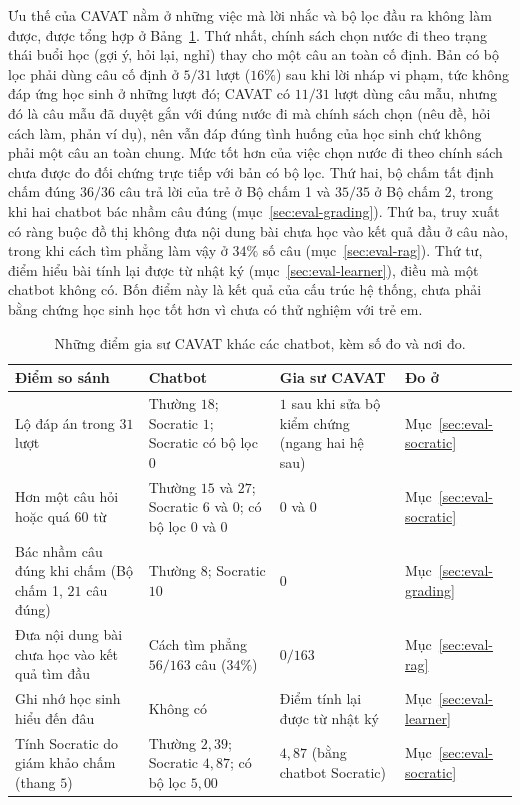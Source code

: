 Ưu thế của CAVAT nằm ở những việc mà lời nhắc và bộ lọc đầu ra không làm được, được tổng hợp ở Bảng~\ref{tab:advantage}. Thứ nhất, chính sách chọn nước đi theo trạng thái buổi học (gợi ý, hỏi lại, nghỉ) thay cho một câu an toàn cố định. Bản có bộ lọc phải dùng câu cố định ở $5/31$ lượt ($16\%$) sau khi lời nháp vi phạm, tức không đáp ứng học sinh ở những lượt đó; CAVAT có $11/31$ lượt dùng câu mẫu, nhưng đó là câu mẫu đã duyệt gắn với đúng nước đi mà chính sách chọn (nêu đề, hỏi cách làm, phản ví dụ), nên vẫn đáp đúng tình huống của học sinh chứ không phải một câu an toàn chung. Mức tốt hơn của việc chọn nước đi theo chính sách chưa được đo đối chứng trực tiếp với bản có bộ lọc. Thứ hai, bộ chấm tất định chấm đúng $36/36$ câu trả lời của trẻ ở Bộ chấm 1 và $35/35$ ở Bộ chấm 2, trong khi hai chatbot bác nhầm câu đúng (mục~\ref{sec:eval-grading}). Thứ ba, truy xuất có ràng buộc đồ thị không đưa nội dung bài chưa học vào kết quả đầu ở câu nào, trong khi cách tìm phẳng làm vậy ở $34\%$ số câu (mục~\ref{sec:eval-rag}). Thứ tư, điểm hiểu bài tính lại được từ nhật ký (mục~\ref{sec:eval-learner}), điều mà một chatbot không có. Bốn điểm này là kết quả của cấu trúc hệ thống, chưa phải bằng chứng học sinh học tốt hơn vì chưa có thử nghiệm với trẻ em.

\begin{table}[H]
\centering
\caption{Những điểm gia sư CAVAT khác các chatbot, kèm số đo và nơi đo.}\label{tab:advantage}
\small
\begin{tabular}{>{\raggedright\arraybackslash}p{4.0cm}>{\raggedright\arraybackslash}p{3.7cm}>{\raggedright\arraybackslash}p{3.7cm}>{\raggedright\arraybackslash}p{2.7cm}}
\toprule
Điểm so sánh & Chatbot & Gia sư CAVAT & Đo ở \\
\midrule
Lộ đáp án trong $31$ lượt & Thường $18$; Socratic $1$; Socratic có bộ lọc $0$ & $1$ sau khi sửa bộ kiểm chứng (ngang hai hệ sau) & Mục~\ref{sec:eval-socratic} \\
Hơn một câu hỏi hoặc quá $60$ từ & Thường $15$ và $27$; Socratic $6$ và $0$; có bộ lọc $0$ và $0$ & $0$ và $0$ & Mục~\ref{sec:eval-socratic} \\
Bác nhầm câu đúng khi chấm (Bộ chấm 1, $21$ câu đúng) & Thường $8$; Socratic $10$ & $0$ & Mục~\ref{sec:eval-grading} \\
Đưa nội dung bài chưa học vào kết quả tìm đầu & Cách tìm phẳng $56/163$ câu ($34\%$) & $0/163$ & Mục~\ref{sec:eval-rag} \\
Ghi nhớ học sinh hiểu đến đâu & Không có & Điểm tính lại được từ nhật ký & Mục~\ref{sec:eval-learner} \\
Tính Socratic do giám khảo chấm (thang $5$) & Thường $2{,}39$; Socratic $4{,}87$; có bộ lọc $5{,}00$ & $4{,}87$ (bằng chatbot Socratic) & Mục~\ref{sec:eval-socratic} \\
\bottomrule
\end{tabular}
\end{table}

